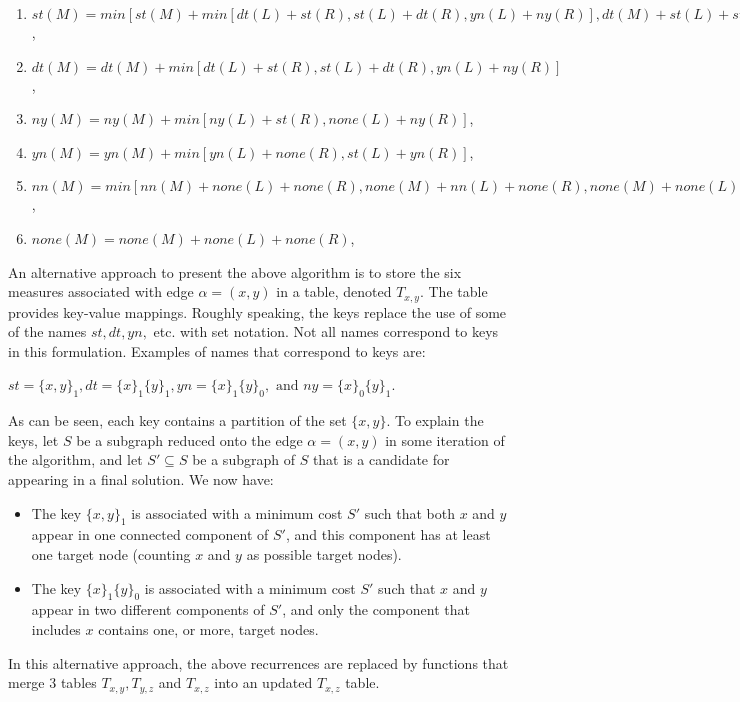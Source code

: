 \begin{enumerate}[noitemsep]
\item $st(M)=min[st(M)+min[dt(L)+st(R),st(L)+dt(R),yn(L)+ny(R)],dt(M)+st(L)+st(R)]$,
\item $dt(M)=dt(M)+min[dt(L)+st(R),st(L)+dt(R),yn(L)+ny(R)]$,
\item $ny(M)=ny(M)+min[ny(L)+st(R),none(L)+ny(R)]$,
\item $yn(M)=yn(M)+min[yn(L)+none(R),st(L)+yn(R)]$,
\item $nn(M)=min[nn(M)+none(L)+none(R),none(M)+nn(L)+none(R),none(M)+none(L)+nn(R),none(M)+ny(L)+yn(R)]$,
\item $none(M)=none(M)+none(L)+none(R)$,
\end{enumerate}



An alternative approach to present the above algorithm is to store the six measures associated with edge $\alpha=(x,y)$ in a table, denoted $T_{x,y}$. The table provides key-value mappings. Roughly speaking, the keys replace the use of some of the names $st,dt,yn, $ etc. with set notation. Not all names correspond to keys in this formulation. Examples of names that correspond to keys are:

$st=\{x,y\}_1,dt=\{x\}_1\{y\}_1, yn=\{x\}_1\{y\}_0, \mbox{ and } ny=\{x\}_0\{y\}_1$.


As can be seen, each key contains a partition of the set $\{x,y\}$. To explain the keys, let $S$ be a subgraph reduced onto the edge $\alpha=(x,y)$ in some iteration of the algorithm, and let $S'\subseteq S$ be a subgraph of $S$ that is a candidate for appearing in a final solution. We now have:

\begin{itemize}[noitemsep]
\item The key $\{x,y\}_1$ is associated with a minimum cost $S'$ such that both $x$ and $y$ appear in one connected component of $S'$, and this component has at least one target node (counting $x$ and $y$ as possible target nodes). 
\item The key $\{x\}_1\{y\}_0$ is associated with a minimum cost $S'$ such that  $x$ and $y$ appear in two different components of $S'$, and only the component that includes $x$ contains one, or more, target nodes.
\end{itemize}
In this alternative approach, the above recurrences are replaced by functions that merge 3 tables $T_{x,y}, T_{y,z}$ and $T_{x,z}$ into an updated $T_{x,z}$ table.

